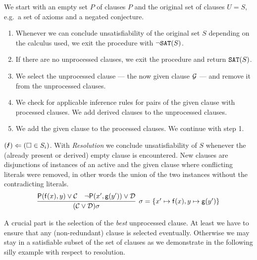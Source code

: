 \begin{procedure}\label{proc:given:clause:algorithm}
	We start with an empty set \( P \) of  clauses \( P \)
	and the original set of  clauses \( U = S \),
	e.g.\ a set of axioms and a negated conjecture.
	\begin{enumerate}
		\item[\jek] Whenever we can conclude unsatisfiability
		of the original set \( S \) depending on the calculus used,
		we exit the procedure with \( \UNSAT[(S)] \).
		\setcounter{enumi}{0}
		\item If there are no unprocessed clauses,
		we exit the procedure and return \(\SAT[(S)]\).
		\item We select the  unprocessed clause --- the now given clause \( \mcG \) --- and remove it from the unprocessed clauses. \hfill\jek{}
		\item We check for applicable inference rules for pairs
		of the given clause with processed clauses.
		We add derived clauses to the unprocessed clauses. \hfill\jek{}
		\item We add the given clause to the processed clauses.
		We continue with step 1.
	\end{enumerate}
\end{procedure}


\begin{remark}
	\((\text{\Lightning}) \Leftarrow (\emptyclause\in S_i) \).
With \emph{Resolution} we conclude unsatisfiability of \( S \) whenever the (already present or derived) empty clause is encountered.
New clauses are disjunctions of instances of an active and the given clause where conflicting literals were removed,
in other words the union of the two instances without the contradicting literals.
\begin{gather*}
\infer[\sigma=\{ x'\mapsto\mf(x), y\mapsto\mg(y') \}]{
	(\mcC \lor \mcD)\sigma
}{
	\mP(\mf(x), y) \lor \mcC & \lnot\mP(x',\mg(y')) \lor \mcD
}
\end{gather*}
\end{remark}

A crucial part is the selection of the \emph{best} unprocessed clause.
At least we have to ensure that any (non-redundant) clause is selected eventually.
Otherwise we may stay in a satisfiable subset of the set of clauses
as we demonstrate in the following silly example with respect to resolution.


